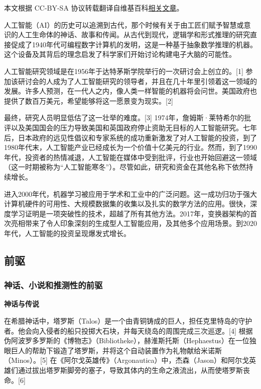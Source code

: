 
本文根据 CC-BY-SA 协议转载翻译自维基百科\href{https://en.wikipedia.org/wiki/History_of_artificial_intelligence}{相关文章}。

人工智能（AI）的历史可以追溯到古代，那个时候有关于由工匠们赋予智慧或意识的人工生命体的神话、故事和传闻。从古代到现代，逻辑学和形式推理的研究直接促成了1940年代可编程数字计算机的发明，这是一种基于抽象数学推理的机器。这个设备及其背后的理念启发了科学家们开始讨论构建电子大脑的可能性。

人工智能研究领域是在1956年于达特茅斯学院举行的一次研讨会上创立的。[1] 参加该研讨会的人成为了人工智能研究的领导者，并且在几十年里引领着这一领域的发展。许多人预测，在一代人之内，像人类一样智能的机器将会问世。美国政府也提供了数百万美元，希望能够将这一愿景变为现实。[2]

最终，研究人员明显低估了这一壮举的难度。[3] 1974年，詹姆斯·莱特希尔的批评以及美国国会的压力导致美国和英国政府停止资助无目标的人工智能研究。七年后，日本政府的远见性倡议和专家系统的成功重新激发了对人工智能的投资，到了1980年代末，人工智能产业已经成长为一个价值十亿美元的行业。然而，到了1990年代，投资者的热情减退，人工智能在媒体中受到批评，行业也开始回避这一领域（这一时期被称为“人工智能寒冬”）。尽管如此，研究和资金在其他名称下依然持续增长。

进入2000年代，机器学习被应用于学术和工业中的广泛问题。这一成功归功于强大计算机硬件的可用性、大规模数据集的收集以及扎实的数学方法的应用。很快，深度学习证明是一项突破性的技术，超越了所有其他方法。2017年，变换器架构的首次亮相带来了令人印象深刻的生成型人工智能应用，及其他多个应用场景。到2020年代，人工智能的投资呈现爆发式增长。
\subsection{前驱}
\subsubsection{神话、小说和推测性的前驱}
\textbf{神话与传说}

在希腊神话中，塔罗斯（Talos）是一个由青铜铸成的巨人，担任克里特岛的守护者。他会向入侵者的船只投掷大石块，并每天绕岛的周围完成三次巡逻。[4] 根据伪阿波罗多罗斯的《博物志》（Bibliotheke），赫淮斯托斯（Hephaestus）在一位独眼巨人的帮助下锻造了塔罗斯，并将这个自动装置作为礼物献给米诺斯（Minos）。[5] 在《阿尔戈英雄传》（Argonautica）中，杰森（Jason）和阿尔戈英雄们通过拔出塔罗斯脚旁的塞子，导致其体内的生命之液流出，从而使塔罗斯丧命。[6]

